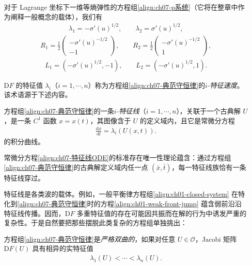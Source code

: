 \documentclass[../../main.tex]{subfiles}
\begin{document}
对于 Lagrange 坐标下一维等熵弹性的方程组\eqref{align:ch07-p系统}（它将在整章中作为阐释一般概念的载体），我们有
\begin{align}
\lambda_1=-\sigma'(u)^{1/2},\qquad \lambda_2=\sigma'(u)^{1/2},
\label{align:ch07-p系统特征值}
\end{align}
\begin{align}
R_1=\tfrac12\begin{pmatrix}-\sigma'(u)^{-1/2}\\-1\end{pmatrix},\qquad
R_2=\tfrac12\begin{pmatrix}-\sigma'(u)^{-1/2}\\1\end{pmatrix},
\label{align:ch07-p系统右特征}
\end{align}
\begin{align}
L_1=(-\sigma'(u)^{1/2},-1),\qquad L_2=(-\sigma'(u)^{1/2},1).
\label{align:ch07-p系统左特征}
\end{align}

$\mathrm{D}F$ 的特征值 $\lambda_i$（$i=1,\cdots,n$）称为方程组\eqref{align:ch07-典范守恒律}的\emph{$i$-特征速度}。该术语源于下述内容。

\begin{definition}[$i$-特征线]\label{definition:ch07-i特征线}
方程组\eqref{align:ch07-典范守恒律}的一条\emph{$i$-特征线}（$i=1,\cdots,n$），关联于一个古典解 $U$，是一条 $C^1$ 函数 $x=x(t)$，其图像含于 $U$ 的定义域内，且它是常微分方程
\begin{align}
\frac{\mathrm{d}x}{\mathrm{d}t}=\lambda_i(U(x,t)).
\label{align:ch07-特征线ODE}
\end{align}
的积分曲线。
\end{definition}

常微分方程\eqref{align:ch07-特征线ODE}的标准存在唯一性理论蕴含：通过方程组\eqref{align:ch07-典范守恒律}的古典解定义域内任一点 $(\bar{x},\bar{t})$，每一特征线族恰有一条特征线穿过。

特征线是各类波的载体。例如，一般平衡律方程组\eqref{align:ch01-closed-system}
在特化到\eqref{align:ch07-典范守恒律}时的方程\eqref{align:ch01-weak-front-jump}
蕴含弱前沿沿特征线传播。因而，$\mathrm{D}F$ 多重特征值的存在可能因共振而在解的行为中诱发严重的复杂性。于是自然要把那些摆脱此类复杂的方程组单独挑出：

\begin{definition}[严格双曲]\label{definition:ch07-严格双曲}
方程组\eqref{align:ch07-典范守恒律}是\emph{严格双曲的}，如果对任意 $U\in\mathscr{O}$，Jacobi 矩阵 $\mathrm{D}F(U)$ 具有相异的实特征值
\begin{align}
\lambda_1(U)<\cdots<\lambda_n(U).
\label{align:ch07-严格双曲不等式}
\end{align}
\end{definition}
\end{document}
